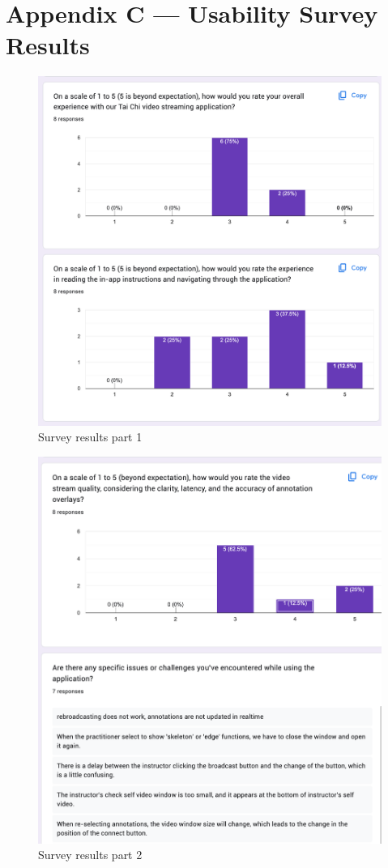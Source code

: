 \documentclass[12pt, titlepage]{article}
\begin{document}
\section*{Appendix C --- Usability Survey Results}
\begin{figure}[h]
  \centering
  \includegraphics[width=1.0\linewidth]{surveyp1.png}
  \caption{Survey results part 1}
  \label{fig:surveyp1}
\end{figure}

\begin{figure}[h]
  \centering
  \includegraphics[width=1.0\linewidth]{surveyp2.png}
  \caption{Survey results part 2}
  \label{fig:surveyp2}
\end{figure}
\end{document}
